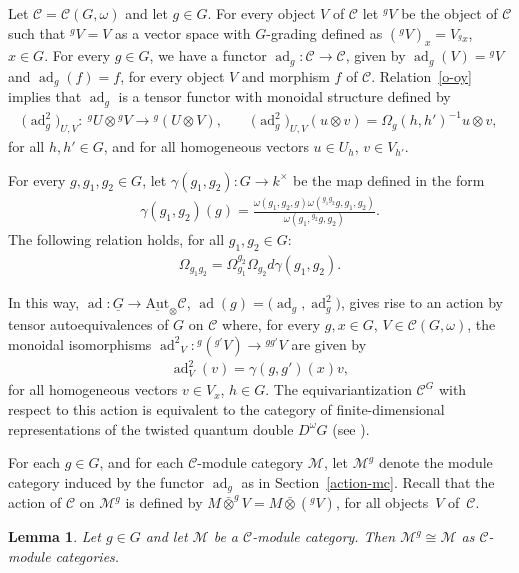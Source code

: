 \documentclass[11pt]{article}
\numberwithin{equation}{section}
\newtheorem{Lemma}[Theorem]{Lemma}
 { \theoremstyle{definition}
\newtheorem{Example}[Theorem]{Example}
\newtheorem{Remark}[Theorem]{Remark} }
\newcommand{\cch}{\Omega}
\newcommand{\oot}{\bar\otimes}
\newcommand{\C}{{\mathcal C}}
\newcommand{\M}{{\mathcal M}}
\newcommand{\1}{\textbf{1}}
\newcommand\ad{\operatorname{ad}}
\begin{document}
Let $\C = \C(G, \omega)$ and let $g \in G$. For every object $V$ of $\C$ let ${}^g V$ be the object of $\C$ such that $^gV = V$ as a vector space with $G$-grading def\/ined as $({}^gV)_x = V_{^g x}$, $x \in G$. For every $g \in G$, we have a functor $\ad_g \colon \C \to \C$, given by $\ad_g(V) = {}^gV$ and $\ad_g(f) = f$, for every object $V$ and morphism $f$ of $\C$.
Relation~\eqref{o-oy} implies that $\ad_g$ is a tensor functor with monoidal structure def\/ined by
\begin{gather*}\big(\ad_g^2\big)_{U, V}\colon \ {}^gU \otimes {}^gV \to {}^g (U \otimes V), \qquad \big(\ad_g^2\big)_{U, V} (u \otimes v) = \cch_g(h, h')^{-1} u\otimes v,\end{gather*}
for all $h, h' \in G$, and for all homogeneous vectors $u \in U_h$, $v \in V_{h'}$.

For every $g, g_1, g_2 \in G$, let $\gamma(g_1, g_2)\colon G \to k^\times$ be the map def\/ined in the form
\begin{gather*}
\gamma(g_1, g_2)(g) = \frac{\omega(g_1, g_2, g) \omega({}^{g_1g_2}g, g_1, g_2)}{\omega(g_1,{}^{g_2}g, g_2)}.
\end{gather*}
The following relation holds, for all $g_1, g_2 \in G$:
\begin{gather}\label{rel-omega}
\cch_{g_1g_2} = \cch_{g_1}^{g_2} \cch_{g_2} d \gamma(g_1, g_2) .
\end{gather}

In this way, $\ad\colon \underline G \to \underline{\text{Aut}}_\otimes\C$, $\ad(g) = \big(\ad_g, \ad_g^2\big)$, gives rise to an action by tensor autoequivalences of $G$ on $\C$ where, for every $g, x \in G$, $V \in \C(G, \omega)$, the monoidal isomorphisms ${\ad^2}_V\colon {}^g({}^{g'}V) \to {}^{gg'}V$ are given by
\begin{gather*}\ad^2_V(v) = \gamma(g, g') (x) v,\end{gather*} for all homogeneous vectors $v \in V_x$, $h \in G$. The equivariantization $\C^G$ with respect to this action is equivalent to the category of f\/inite-dimensional representations of the twisted quantum double $D^\omega G$ (see \cite[Lemma~6.3]{naidu}).

For each $g \in G$, and for each $\C$-module category $\M$, let $\M^g$ denote the module category induced by the functor $\ad_g$ as in Section~\ref{action-mc}. Recall that the action of $\C$ on $\M^g$ is def\/ined by $M\oot^g V = M\oot ({}^gV)$, for all objects~$V$ of~$\C$.

\begin{Lemma}\label{adj-triv} Let $g \in G$ and let $\M$ be a $\C$-module category. Then $\M^g \cong \M$ as $\C$-module categories.
\end{Lemma}
\end{document}
